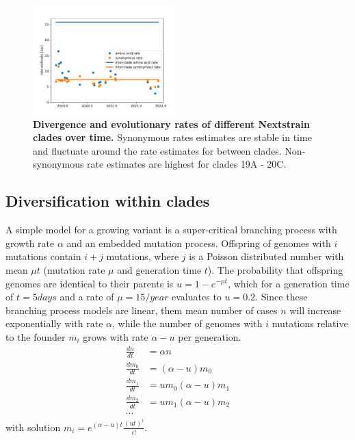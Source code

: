 \documentclass[aps,rmp, twocolumn]{revtex4}
\begin{document}
\begin{figure}
    \includegraphics[width=0.5\textwidth]{figures/rate_progression.pdf}
    \caption{{\bf Divergence and evolutionary rates of different Nextstrain clades over time.} Synonymous rates estimates are stable in time and fluctuate around the rate estimates for between clades. Non-synonymous rate estimates are highest for clades 19A - 20C.
    \label{fig:rate_progression} }
\end{figure}




\subsection*{Diversification within clades}
A simple model for a growing variant is a super-critical branching process with growth rate $\alpha$ and an embedded mutation process.
Offspring of genomes with $i$ mutations contain $i+j$ mutations, where $j$ is a Poisson distributed number with mean $\mu t$ (mutation rate $\mu$ and generation time $t$).
The probability that offspring genomes are identical to their parents is $u = 1-e^{-\mu t}$, which for a generation time of $t=5days$ and a rate of $\mu = 15/year$ evaluates to $u=0.2$.
Since these branching process models are linear, them mean number of cases $n$ will increase exponentially with rate $\alpha$, while the number of genomes with $i$ mutations relative to the founder $m_i$ grows with rate $\alpha - u$ per generation.
\begin{equation}
    \begin{split}
        \frac{dn}{dt} &= \alpha n \\
        \frac{dm_0}{dt} &= (\alpha - u) m_0 \\
        \frac{dm_1}{dt} &= u m_0 (\alpha - u) m_1 \\
        \frac{dm_2}{dt} &= u m_1 (\alpha - u) m_2 \\
        \cdots
    \end{split}
\end{equation}
with solution $m_i = e^{(\alpha - u)t} \frac{(ut)^i}{i!}$.
\end{document}
